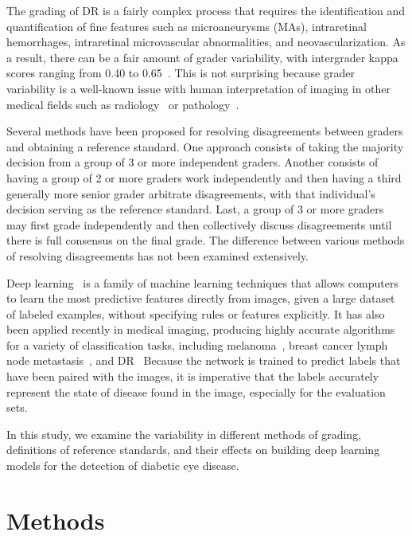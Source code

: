 \documentclass{llncs}
\begin{document}
The grading of DR is a fairly complex process that requires the identification and quantification of fine features such as microaneurysms (MAs), intraretinal hemorrhages, intraretinal microvascular abnormalities, and neovascularization.  As a result, there can be a fair amount of grader variability, with intergrader kappa scores ranging from 0.40 to 0.65~\cite{early1991grading,scott2008agreement,li2010digital,gangaputra2013comparison,ruamviboonsuk2006interobserver}. This is not surprising because grader variability is a well-known issue with human interpretation of imaging in other medical fields such as radiology~\cite{elmore1994variability} or pathology~\cite{elmore2015diagnostic}.

Several methods have been proposed for resolving disagreements between graders and obtaining a reference standard. One approach consists of taking the majority decision from a group of 3 or more independent graders.  Another consists of having a group of 2 or more graders work independently and then having a third generally more senior grader arbitrate disagreements, with that individual's decision serving as the reference standard. Last, a group of 3 or more graders may first grade independently and then collectively discuss disagreements until there is full consensus on the final grade. The difference between various methods of resolving disagreements has not been examined extensively.

Deep learning~\cite{lecun2015deep} is a family of machine learning techniques that allows computers to learn the most predictive features directly from images, given a large dataset of labeled examples, without specifying rules or features explicitly. It has also been applied recently in medical imaging, producing highly accurate algorithms for a variety of classification tasks, including melanoma~\cite{esteva2017dermatologist}, breast cancer lymph node metastasis~\cite{liu2017detecting,bejnordi2017diagnostic}, and DR~\cite{gulshan2016development,gargeya2017automated,ting2017development} Because the network is trained to predict labels that have been paired with the images, it is imperative that the labels accurately represent the state of disease found in the image, especially for the evaluation sets.

In this study, we examine the variability in different methods of grading, definitions of reference standards, and their effects on building deep learning models for the detection of diabetic eye disease.

\section{Methods}
\end{document}
